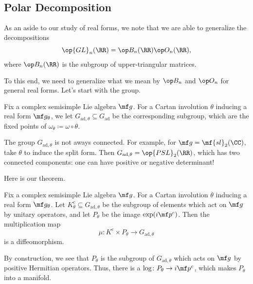 \documentclass[../notes.tex]{subfiles}
\begin{document}
\subsection{Polar Decomposition}
As an aside to our study of real forms, we note that we are able to generalize the decompositions
\[\op{GL}_n(\RR)=\op B_n(\RR)\op O_n(\RR),\]
where $\op B_n(\RR)$ is the subgroup of upper-triangular matrices.

To this end, we need to generalize what we mean by $\op B_n$ and $\op O_n$ for general real forms. Let's start with the group.
\begin{notation}
	Fix a complex semisimple Lie algebra $\mf g$. For a Cartan involution $\theta$ inducing a real form $\mf g_\theta$, we let $G_{\mathrm{ad},\theta}\subseteq G_{\mathrm{ad}}$ be the corresponding subgroup, which are the fixed points of $\omega_\theta\coloneqq\omega\circ\theta$.
\end{notation}
\begin{example}
	The group $G_{\mathrm{ad},\theta}$ is not aways connected. For example, for $\mf g=\mf{sl}_2(\CC)$, take $\theta$ to induce the split form. Then $G_{\mathrm{ad},\theta}=\op{PSL}_2(\RR)$, which has two connected components: one can have positive or negative determinant!
\end{example}
Here is our theorem.
\begin{theorem} \label{thm:polar-decomp}
	Fix a complex semisimple Lie algebra $\mf g$. For a Cartan involution $\theta$ inducing a real form $\mf g_\theta$. Let $K^c_\theta\subseteq G_{\mathrm{ad},\theta}$ be the subgroup of elements which act on $\mf g$ by unitary operators, and let $P_\theta$ be the image $\exp(i\mf p^c)$. Then the multiplication map
	\[\mu\colon K^c\times P_\theta\to G_{\mathrm{ad},\theta}\]
	is a diffeomorphism.
\end{theorem}
\begin{remark}
	By construction, we see that $P_\theta$ is the subgroup of $G_{\mathrm{ad},\theta}$ which acts on $\mf g$ by positive Hermitian operators. Thus, there is a $\log\colon P_\theta\to i\mf p^c$, which makes $P_\theta$ into a manifold.
\end{remark}
\end{document}

